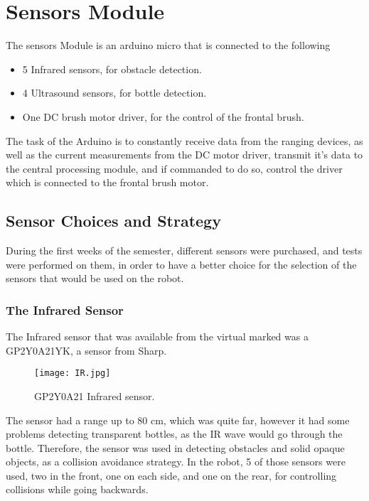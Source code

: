 %
%   
%

\chapter{Sensors Module}
The sensors Module is an arduino micro that is connected to the following
\begin{itemize}
\item 5 Infrared sensors, for obstacle detection.
\item 4 Ultrasound sensors, for bottle detection.
\item One DC brush motor driver, for the control of the frontal brush.
\end{itemize}

The task of the Arduino is to constantly receive data from the ranging devices, as well as the current measurements from the DC motor driver, transmit it's data to the central processing module, and if commanded to do so, control the driver which is connected to the frontal brush motor. 

\section{Sensor Choices and Strategy}
During the first weeks of the semester, different sensors were purchased, and tests were performed on them, in order to have a better choice for the selection of the sensors that would be used on the robot. 


\subsection{The Infrared Sensor}
The Infrared sensor that was available from the virtual marked was a GP2Y0A21YK, a sensor from Sharp. 

\begin{figure}[H]
  \centering
  \texttt{[image: IR.jpg]}
  \caption{GP2Y0A21 Infrared sensor.}
\label{fig:IR}
\end{figure}

The sensor had a range up to 80 cm, which was quite far, however it had some problems detecting transparent bottles, as the IR wave would go through the bottle. Therefore, the sensor was used in detecting obstacles and solid opaque objects, as a collision avoidance strategy. In the robot, 5 of those sensors were used, two in the front, one on each side, and one on the rear, for controlling collisions while going backwards.

